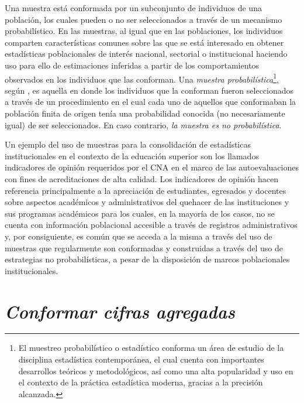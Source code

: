 \documentclass[
]{book}
\begin{document}
Una muestra está conformada por un subconjunto de individuos de una población, los cuales pueden o no ser seleccionados a través de un mecanismo probabilístico. En las muestras, al igual que en las poblaciones, los individuos comparten características comunes sobre las que se está interesado en obtener estadísticas poblacionales de interés nacional, sectorial o institucional haciendo uso para ello de estimaciones inferidas a partir de los comportamientos observados en los individuos que las conforman. Una \emph{muestra probabilística}\footnote{El muestreo probabilístico o estadístico conforma un área de estudio de la disciplina estadística contemporánea, el cual cuenta con importantes desarrollos teóricos y metodológicos, así como una alta popularidad y uso en el contexto de la práctica estadística moderna, gracias a la precisión alcanzada.}, según \citet{levy2013sampling}, es aquella en donde los individuos que la conforman fueron seleccionados a través de un procedimiento en el cual cada uno de aquellos que conformaban la población finita de origen tenía una probabilidad conocida (no necesariamente igual) de ser seleccionados. En caso contrario, \emph{la muestra es no probabilística}.

Un ejemplo del uso de muestras para la consolidación de estadísticas institucionales en el contexto de la educación superior son los llamados indicadores de opinión requeridos por el CNA en el marco de las autoevaluaciones con fines de acreditaciones de alta calidad. Los indicadores de opinión hacen referencia principalmente a la apreciación de estudiantes, egresados y docentes sobre aspectos académicos y administrativos del quehacer de las instituciones y sus programas académicos para los cuales, en la mayoría de los casos, no se cuenta con información poblacional accesible a través de registros administrativos y, por consiguiente, es común que se acceda a la misma a través del uso de muestras que regularmente son conformadas y construidas a través del uso de estrategias no probabilísticas, a pesar de la disposición de marcos poblacionales institucionales.

\hypertarget{conformar-cifras-agregadas}{%
\chapter{\texorpdfstring{\textbf{\emph{Conformar cifras agregadas}}}{Conformar cifras agregadas}}\label{conformar-cifras-agregadas}}
\end{document}
